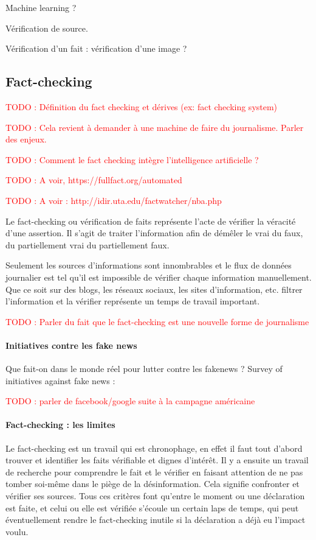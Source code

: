 \documentclass[12pt]{article}
\newcommand\todo[1]{\textcolor{red}{TODO : #1}}
\begin{document}
Machine learning ?

Vérification de source.

Vérification d'un fait : vérification d'une image ?


\subsection{Fact-checking}

\todo{Définition du fact checking et dérives (ex: fact checking system)}

\todo{Cela revient à demander à une machine de faire du journalisme. Parler des enjeux.}

\todo{Comment le fact checking intègre l'intelligence artificielle ?}

\todo{A voir, https://fullfact.org/automated}

\todo{A voir : http://idir.uta.edu/factwatcher/nba.php}

Le fact-checking ou vérification de faits représente l'acte de vérifier la véracité d'une assertion. Il s'agit de traiter l'information afin de démêler le vrai du faux, du partiellement vrai du partiellement faux.

Seulement les sources d'informations sont innombrables et le flux de données journalier est tel qu'il est impossible de vérifier chaque information manuellement. Que ce soit sur des blogs, les réseaux sociaux, les sites d'information, etc. filtrer l'information et la vérifier représente un temps de travail important.

\todo{Parler du fait que le fact-checking est une nouvelle forme de journalisme}

\paragraph{Initiatives contre les fake news}

Que fait-on dans le monde réel pour lutter contre les fakenews ?
Survey of initiatives against fake news : \cite{haciyakupoglu2018countering}

\todo{parler de facebook/google suite à la campagne américaine}

\paragraph{Fact-checking : les limites}

Le fact-checking est un travail qui est chronophage, en effet il faut tout d'abord trouver et identifier les faits vérifiable et dignes d'intérêt. Il y a ensuite un travail de recherche pour comprendre le fait et le vérifier en faisant attention de ne pas tomber soi-même dans le piège de la désinformation. Cela signifie confronter et vérifier ses sources. 
Tous ces critères font qu'entre le moment ou une déclaration est faite, et celui ou elle est vérifiée s'écoule un certain laps de temps, qui peut éventuellement rendre le fact-checking inutile si la déclaration a déjà eu l'impact voulu.
\end{document}
